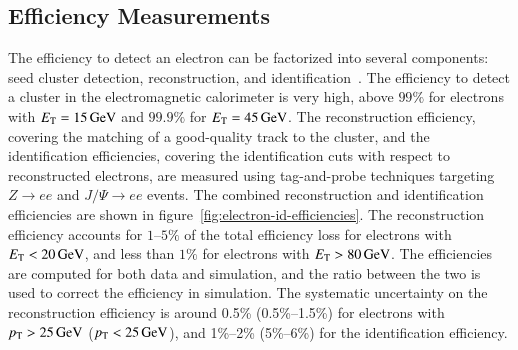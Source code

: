 \subsection{Efficiency Measurements}\label{sec:reco-electron-efficiency}
The efficiency to detect an electron can be factorized into several components: seed cluster detection, reconstruction, and identification~\cite{TheATLASCollaboration:2014vz}. The efficiency to detect a cluster in the electromagnetic calorimeter is very high, above $99\%$ for electrons with $E_{\mathrm{T}}=\SI{15}{\giga\electronvolt}$ and $99.9\%$ for $E_{\mathrm{T}}=\SI{45}{\giga\electronvolt}$. The reconstruction efficiency, covering the matching of a good-quality track to the cluster, and the identification efficiencies, covering the identification cuts with respect to reconstructed electrons, are measured using tag-and-probe techniques targeting $Z\rightarrow ee$ and $J/\Psi\rightarrow ee$ events. The combined reconstruction and identification efficiencies are shown in figure~\ref{fig:electron-id-efficiencies}. The reconstruction efficiency accounts for $1$--$5\%$ of the total efficiency loss for electrons with $E_{\mathrm{T}}<\SI{20}{\giga\electronvolt}$, and less than $1\%$ for electrons with $E_{\mathrm{T}}>\SI{80}{\giga\electronvolt}$. The efficiencies are computed for both data and simulation, and the ratio between the two is used to correct the efficiency in simulation. The systematic uncertainty on the reconstruction efficiency is around 0.5\% (0.5\%--1.5\%) for electrons with $p_{\text{T}}>\SI{25}{\giga\electronvolt}$ ($p_{\text{T}}<\SI{25}{\giga\electronvolt}$), and 1\%--2\% (5\%--6\%) for the identification efficiency. 


